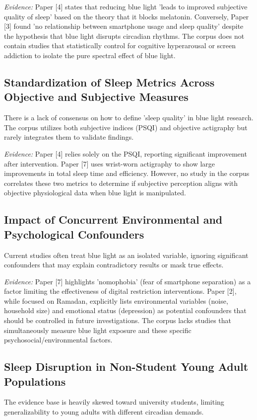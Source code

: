 \documentclass[conference]{IEEEtran}
\begin{document}
\textit{Evidence:} Paper [4] states that reducing blue light 'leads to improved subjective quality of sleep' based on the theory that it blocks melatonin. Conversely, Paper [3] found 'no relationship between smartphone usage and sleep quality' despite the hypothesis that blue light disrupts circadian rhythms. The corpus does not contain studies that statistically control for cognitive hyperarousal or screen addiction to isolate the pure spectral effect of blue light.

\subsection{Standardization of Sleep Metrics Across Objective and Subjective Measures}
There is a lack of consensus on how to define 'sleep quality' in blue light research. The corpus utilizes both subjective indices (PSQI) and objective actigraphy but rarely integrates them to validate findings.

\textit{Evidence:} Paper [4] relies solely on the PSQI, reporting significant improvement after intervention. Paper [7] uses wrist-worn actigraphy to show large improvements in total sleep time and efficiency. However, no study in the corpus correlates these two metrics to determine if subjective perception aligns with objective physiological data when blue light is manipulated.

\subsection{Impact of Concurrent Environmental and Psychological Confounders}
Current studies often treat blue light as an isolated variable, ignoring significant confounders that may explain contradictory results or mask true effects.

\textit{Evidence:} Paper [7] highlights 'nomophobia' (fear of smartphone separation) as a factor limiting the effectiveness of digital restriction interventions. Paper [2], while focused on Ramadan, explicitly lists environmental variables (noise, household size) and emotional status (depression) as potential confounders that should be controlled in future investigations. The corpus lacks studies that simultaneously measure blue light exposure and these specific psychosocial/environmental factors.

\subsection{Sleep Disruption in Non-Student Young Adult Populations}
The evidence base is heavily skewed toward university students, limiting generalizability to young adults with different circadian demands.
\end{document}
